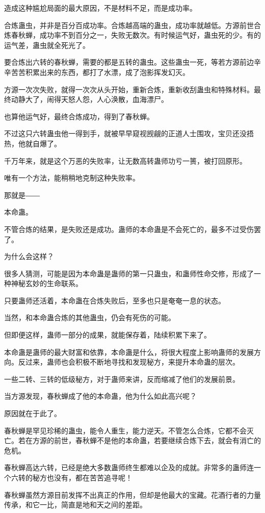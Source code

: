 \begin{this_body}
造成这种尴尬局面的最大原因，不是材料不足，而是成功率。

合炼蛊虫，并非是百分百成功率。合炼越高端的蛊虫，成功率就越低。方源前世合炼春秋蝉，成功率不到百分之一，失败无数次。有时候运气好，蛊虫死的少。有的运气差，蛊虫就全死光了。

要合炼出六转的春秋蝉，需要的都是五转的蛊虫。这些蛊虫一死，等若方源前边辛辛苦苦积累出来的东西，都打了水漂，成了泡影挥发幻灭。

方源一次次失败，就得一次次从头开始，重新合炼，重新收刮蛊虫和特殊材料。最终动静大了，闹得天怒人怨，人心涣散，血海漂尸。

也算他运气好，最终合炼成功，得到了春秋蝉。

不过这只六转蛊虫他一得到手，就被早早窥视觊觎的正道人士围攻，宝贝还没捂热，他就自爆了。

千万年来，就是这个万恶的失败率，让无数高转蛊师功亏一篑，被打回原形。

唯有一个方法，能稍稍地克制这种失败率。

那就是――

本命蛊。

不管合炼的结果，是失败还是成功。蛊师的本命蛊是不会死亡的，最多不过受伤罢了。

为什么会这样？

很多人猜测，可能是因为本命蛊是蛊师的第一只蛊虫，和蛊师性命交修，形成了一种神秘玄妙的生命联系。

只要蛊师还活着，本命蛊在合炼失败后，至多也只是奄奄一息的状态。

当然，和本命蛊合炼的其他蛊虫，仍会有死伤的可能。

但即便这样，蛊师一部分的成果，就能保存着，陆续积累下来了。

本命蛊是蛊师的最大财富和依靠，本命蛊是什么，将很大程度上影响蛊师的发展方向。反过来，蛊师也会积极不断地寻找和发现秘方，来提升本命蛊的层次。

一些二转、三转的低级秘方，对于蛊师来讲，反而缩减了他们的发展前景。

当方源发现，春秋蝉成了他的本命蛊，他为什么如此高兴呢？

原因就在于此了。

春秋蝉是罕见珍稀的蛊虫，能令人重生，能力逆天。不管怎么合炼，它都不会灭亡。若在方源的前世，春秋蝉不是他的本命蛊，若要继续合炼下去，就会有消亡的危机。

春秋蝉高达六转，已经是绝大多数蛊师终生都难以企及的成就。非常多的蛊师连一个六转的秘方也没有，都在苦苦追寻呢！

春秋蝉虽然方源目前发挥不出真正的作用，但却是他最大的宝藏。花酒行者的力量传承，和它一比，简直是地和天之间的差距。

\end{this_body}

